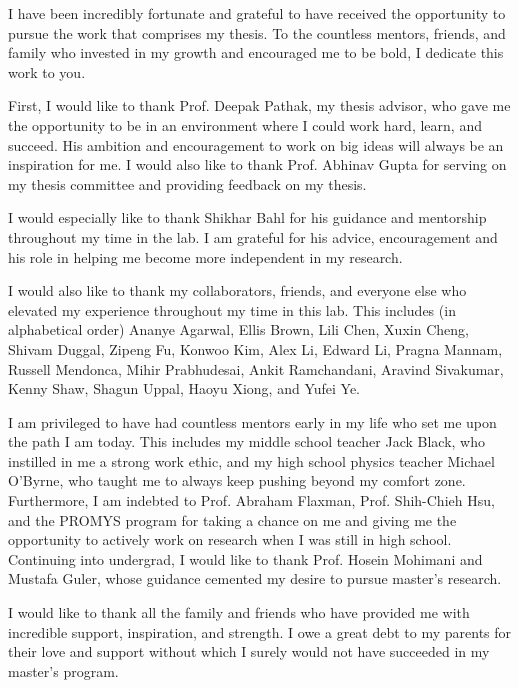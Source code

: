 \documentclass[12pt]{cmuthesis}
\begin{document}
\begin{acknowledgments}
  I have been incredibly fortunate and grateful to have 
  received the opportunity to pursue the work that comprises
  my thesis. To the countless mentors, friends, and
  family who invested in my growth and encouraged me to be
  bold, I dedicate this work to you.

  First, I would like to thank Prof. Deepak Pathak, my 
  thesis  advisor, who gave me the opportunity to be 
  in an environment where I could work hard, learn, 
  and succeed. His ambition and encouragement to work
  on big ideas will always be an inspiration for me. 
  I would also like to thank Prof. Abhinav Gupta for
  serving on my thesis committee and providing feedback
  on my thesis.

  I would especially like to thank Shikhar Bahl for his
  guidance and mentorship throughout my time in the lab. 
  I am grateful for his advice, encouragement and his role
  in helping me become more independent in my research.

  I would also like to thank my collaborators, friends, 
  and everyone else who elevated my experience throughout
  my time in this lab. This includes (in alphabetical order)
  Ananye Agarwal, Ellis Brown, Lili Chen, Xuxin Cheng,
  Shivam Duggal, Zipeng Fu, Konwoo Kim, Alex Li, Edward Li, 
  Pragna Mannam, Russell Mendonca, Mihir Prabhudesai,
  Ankit Ramchandani, Aravind Sivakumar, Kenny Shaw, 
  Shagun Uppal, Haoyu Xiong, and Yufei Ye.

  I am privileged to have had countless mentors early in
  my life who set me upon the path I am today. This 
  includes my middle school teacher Jack Black, who 
  instilled in me a strong work ethic, and my high school 
  physics teacher Michael O'Byrne, who taught me to always
  keep pushing beyond my comfort zone. Furthermore, I 
  am indebted to Prof. Abraham Flaxman, Prof. Shih-Chieh
  Hsu, and the PROMYS program for taking a chance on me
  and giving me the opportunity to actively work on 
  research when I was still in high school. Continuing 
  into undergrad, I would like to thank Prof. Hosein 
  Mohimani and Mustafa Guler, whose guidance cemented my 
  desire to pursue master's research.

  I would like to thank all the family and friends who 
  have provided me with incredible support, inspiration,
  and strength. I owe a great debt to my parents for their
  love and support without which I surely would not have
  succeeded in my master's program.
\end{acknowledgments}
\end{document}
